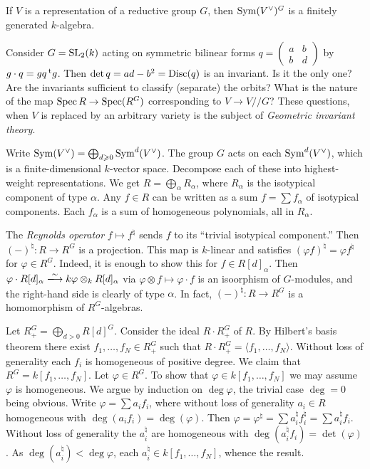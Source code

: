 \begin{theo}[Hilbert]
If $V$ is a representation of a reductive group $G$, then 
$\operatorname{Sym}(V^\vee)^G$ is a finitely generated $k$-algebra. 
\end{theo}

\begin{example}
Consider $G=\operatorname{SL}_2(k)$ acting on symmetric bilinear forms 
$q=\begin{pmatrix} a & b \\ b & d\end{pmatrix}$ by 
$g\cdot q = g q \prescript{\mathrm{t}}{}{g}$. Then $\det q=a d-b^2=\operatorname{Disc}(q)$ is an 
invariant. Is it the only one? Are the invariants sufficient to classify 
(separate) the orbits? What is the nature of the map 
$\operatorname{Spec} R \to \operatorname{Spec}(R^G)$ corresponding to 
$V\to V/\!\!\! / G$? These questions, when $V$ is replaced by an arbitrary 
variety is the subject of \emph{Geometric invariant theory}. 
\end{example}

Write $\operatorname{Sym}(V^\vee) = \bigoplus_{d\geqslant 0} \operatorname{Sym}^d(V^\vee)$. 
The group $G$ acts on each $\operatorname{Sym}^d(V^\vee)$, which is a finite-dimensional 
$k$-vector space. Decompose each of these into highest-weight representations. 
We get $R=\bigoplus_\alpha R_\alpha$, where $R_\alpha$ is the isotypical component 
of type $\alpha$. Any $f\in R$ can be written as a sum 
$f=\sum f_\alpha$ of isotypical components. Each $f_\alpha$ is a sum of 
homogeneous polynomials, all in $R_\alpha$. 

The \emph{Reynolds operator} $f\mapsto f^\natural$ sends $f$ to its ``trivial 
isotypical component.'' Then $(-)^\natural:R\to R^G$ is a projection. This map is 
$k$-linear and satisfies $(\varphi f)^\natural = \varphi f^\natural$ for 
$\varphi\in R^G$. Indeed, it is enough to show this for $f\in R[d]_\alpha$. 
Then 
$\varphi\cdot R[d]_\alpha \iso k\varphi\otimes_k R[d]_\alpha$ via 
$\varphi\otimes f\mapsto \varphi\cdot f$ is an isoorphism of 
$G$-modules, and the right-hand side is clearly of type $\alpha$. In fact, 
$(-)^\natural:R\to R^G$ is a homomorphism of $R^G$-algebras. 

Let $R_+^G=\bigoplus_{d>0} R[d]^G$. Consider the ideal 
$R\cdot R_+^G$ of $R$. By Hilbert's basis theorem there exist 
$f_1,\dots,f_N\in R_+^G$ such that 
$R\cdot R_+^G = \langle f_1,\dots,f_N\rangle$. Without loss of generality 
each $f_i$ is homogeneous of positive degree. We claim that 
$R^G=k[f_1,\dots,f_N]$. Let $\varphi\in R^G$. To show that 
$\varphi\in k[f_1,\dots,f_N]$ we may assume $\varphi$ is homogeneous. We 
argue by induction on $\deg\varphi$, the trivial case $\deg=0$ being 
obvious. Write $\varphi=\sum a_i f_i$, where without loss of generality 
$a_i\in R$ homogeneous with $\deg(a_i f_i) = \deg(\varphi)$. 
Then 
$\varphi=\varphi^\natural = \sum a_i^\natural f_i^\natural = \sum a_i^\natural f_i$. 
Without loss of generality the $a_i^\natural$ are homogeneous with 
$\deg(a_i^\natural f_i) = \det(\varphi)$. As 
$\deg(a_i^\natural)<\deg\varphi$, each $a_i^\natural\in k[f_1,\dots,f_N]$, 
whence the result. 


